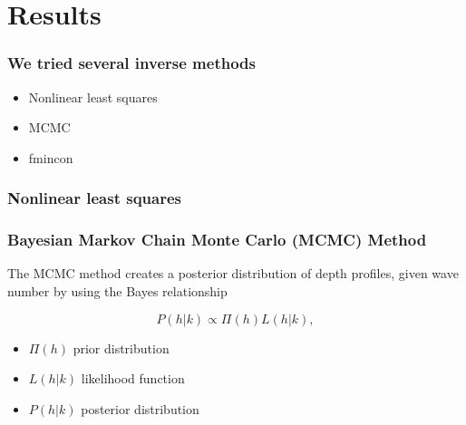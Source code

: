 \documentclass[7pt]{beamer}
\begin{document}
\section{Results}

\begin{frame}
 \frametitle{We tried several inverse methods}
\begin{itemize}
\item Nonlinear least squares
\item MCMC
\item fmincon
\end{itemize}
\end{frame}


 \begin{frame}
\frametitle{Nonlinear least squares}


\end{frame}



 \begin{frame}
\frametitle{Bayesian Markov Chain Monte Carlo (MCMC) Method}
The MCMC method creates a posterior distribution of depth profiles, given wave number by using the Bayes relationship

\begin{equation}\label{bayes}
P(h|%
k) \propto \Pi(h)L(h|%
k),
\end{equation} 
\begin{itemize}
\item $\Pi(h)$  prior distribution
\item $L(h|%
k)$ likelihood function
\item $P(h|%
k)$ posterior distribution
\end{itemize}
\end{frame}
\end{document}
